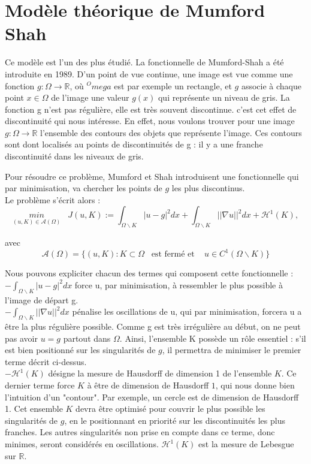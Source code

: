 \section{Modèle théorique de Mumford Shah}

Ce modèle est l'un des plus étudié. La fonctionnelle de Mumford-Shah a été introduite en 1989. D'un point de vue continue, une image est vue comme une fonction $g : \Omega \rightarrow \mathbb{R}$, où $^Omega$ est par exemple un rectangle, et $g$ associe à chaque point $x \in \Omega$ de l'image une valeur $g(x)$ qui représente un niveau de gris. La fonction g n'est pas régulière, elle est très souvent discontinue. c'est cet effet de discontinuité qui nous intéresse. En effet, nous voulons trouver pour une image $g : \Omega \rightarrow \mathbb{R}$ l'ensemble des contours des objets que représente l'image. Ces contours sont dont localisés au points de discontinuités de g : il y a une franche discontinuité dans les niveaux de gris.

Pour résoudre ce problème, Mumford et Shah introduisent une fonctionnelle qui par minimisation, va chercher les points de $g$ les plus discontinus. \\

Le problème s'écrit alors : 
\[\underset{(u, K) \in \mathcal{A}(\Omega)}{min} \; \; \; J(u,K) := \int_{\Omega \backslash K} |u - g |^2 dx + \int_{\Omega \backslash K} ||\nabla u ||^2 dx + \mathcal{H}^1(K) ,  \]

avec 
\[ \mathcal{A} (\Omega) = \{ (u,K) : K \subset \Omega \; \; \; \text{est fermé et } \; \; \; u \in C^1(\Omega \backslash K) \} \] 

Nous pouvons expliciter chacun des termes qui composent cette fonctionnelle :\\

$ - \int_{\Omega \backslash K} |u - g |^2 dx $ force u, par minimisation, à ressembler le plus possible à l'image de départ g. \\

$ - \int_{\Omega \backslash K} ||\nabla u ||^2 dx $ pénalise les oscillations de u, qui par minimisation, forcera u a être la plus régulière possible. Comme g est très irrégulière au début, on ne peut pas avoir $ u = g$ partout dans $\Omega$. Ainsi, l'ensemble K possède un rôle essentiel : s'il est bien positionné sur les singularités de $g$, il permettra de minimiser le premier terme décrit ci-dessus.\\

$ - \mathcal{H}^1(K) $ désigne la mesure de Hausdorff de dimension 1 de l'ensemble $K$. Ce dernier terme force $K$ à être de dimension de Hausdorff $1$, qui nous donne bien l'intuition d'un "contour". Par exemple, un cercle est de dimension de Hausdorff 1. Cet ensemble $K$ devra être optimisé pour couvrir le plus possible les singularités de $g$, en le positionnant en priorité sur les discontinuités les plus franches. Les autres singularités non prise en compte dans ce terme, donc minimes, seront considérés en oscillations. $\mathcal{H}^1(K)$ est la mesure de Lebesgue sur $\mathbb{R}$.\\


